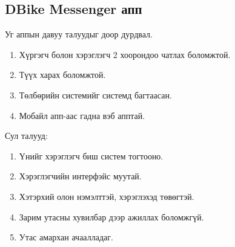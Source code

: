 \subsection{DBike Messenger апп}
Уг аппын давуу талуудыг доор дурдвал.
\begin{enumerate}[noitemsep]
    \item Хүргэгч болон хэрэглэгч 2 хоорондоо чатлах боломжтой.
    \item Түүх харах боломжтой.
    \item Төлбөрийн системийг системд багтаасан.
    \item Мобайл апп-аас гадна вэб апптай.
\end{enumerate}

\noindent Сул талууд:
\begin{enumerate}[noitemsep]
    \item Үнийг хэрэглэгч биш систем тогтооно.
	\item Хэрэглэгчийн интерфэйс муутай.
	\item Хэтэрхий олон нэмэлттэй, хэрэглэхэд төвөгтэй.
	\item Зарим утасны хувилбар дээр ажиллах боломжгүй.
	\item Утас амархан ачаалладаг.
\end{enumerate}


